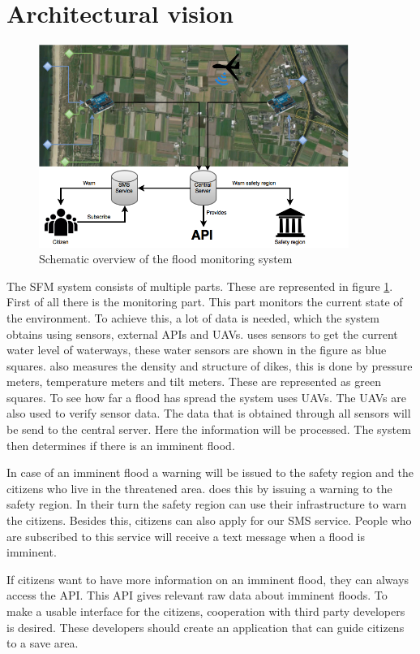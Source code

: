 \section{Architectural vision}
\label{sec:archvision}
\begin{figure}[H]
	\includegraphics[keepaspectratio=true,width=0.9\textwidth]{images/archVision.png}
	\caption{Schematic overview of the flood monitoring system}
	\label{fig:architectural-vision}
\end{figure}

The \gls{SFM} system consists of multiple parts. These are represented in figure \ref{fig:architectural-vision}. First of all there is the monitoring part. This part monitors the current state of the environment. To achieve this, a lot of data is needed, which the system obtains using sensors, external \gls{API}s and \gls{UAV}s. \CompanyName uses sensors to get the current water level of waterways, these water sensors are shown in the figure as blue squares. \CompanyName also measures the density and structure of dikes, this is done by pressure meters, temperature meters and tilt meters. These are represented as green squares. To see how far a flood has spread the system uses UAVs. The UAVs are also used to verify sensor data. The data that is obtained through all sensors will be send to the central server. Here the information will be processed. The system then determines if there is an imminent flood.

In case of an imminent flood a warning will be issued to the safety region and the citizens who live in the threatened area. \CompanyName does this by issuing a warning to the safety region. In their turn the safety region can use their infrastructure to warn the citizens. Besides this, citizens can also apply for our SMS service. People who are subscribed to this service will receive a text message when a flood is imminent.

If citizens want to have more information on an imminent flood, they can always access the API. This API gives relevant raw data about imminent floods. To make a usable interface for the citizens, cooperation with third party developers is desired. These developers should create an application that can guide citizens to a save area.
